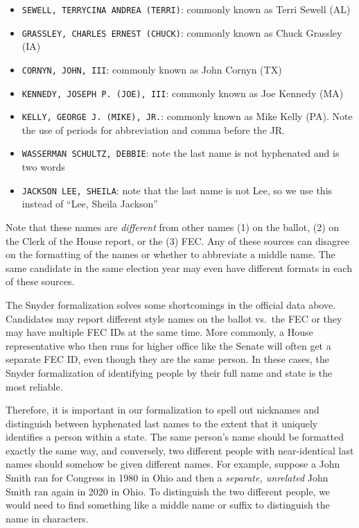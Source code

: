 \documentclass[12pt]{article}
\begin{document}
\begin{itemize}
\tightlist
\item
  \texttt{SEWELL,\ TERRYCINA\ ANDREA\ (TERRI)}: commonly known as Terri
  Sewell (AL)
\item
  \texttt{GRASSLEY,\ CHARLES\ ERNEST\ (CHUCK)}: commonly known as Chuck
  Grassley (IA)
\item
  \texttt{CORNYN,\ JOHN,\ III}: commonly known as John Cornyn (TX)
\item
  \texttt{KENNEDY,\ JOSEPH\ P.\ (JOE),\ III}: commonly known as Joe
  Kennedy (MA)
\item
  \texttt{KELLY,\ GEORGE\ J.\ (MIKE),\ JR.}: commonly known as Mike
  Kelly (PA). Note the use of periods for abbreviation and comma before
  the JR.
\item
  \texttt{WASSERMAN\ SCHULTZ,\ DEBBIE}: note the last name is not
  hyphenated and is two words
\item
  \texttt{JACKSON\ LEE,\ SHEILA}: note that the last name is not Lee, so
  we use this instead of ``Lee, Sheila Jackson''
\end{itemize}

Note that these names are \emph{different} from other names (1)
on the ballot, (2) on the Clerk of the House report, or the (3) FEC. Any
of these sources can disagree on the formatting of the names or whether
to abbreviate a middle name. The same candidate in the same election year may
even have different formats in each of these sources.

The Snyder formalization solves some shortcomings in the official data
above. Candidates may report different style names on the ballot vs.~the
FEC or they may have multiple FEC IDs at the same time. More commonly, a
House representative who then runs for higher office like the Senate will
often get a separate FEC ID, even though they are the same person. In
these cases, the Snyder formalization of identifying people by their full
name and state is the most reliable.

Therefore, it is important in our formalization to spell out nicknames
and distinguish between hyphenated last names to the extent that it
uniquely identifies a person within a state. The same person's name
should be formatted exactly the same way, and conversely, two different
people with near-identical last names should somehow be given
{different} names. For example, suppose a John Smith ran for Congress
in 1980 in Ohio and then a \emph{separate, unrelated} John Smith ran
again in 2020 in Ohio. To distinguish the two different people, we
would need to find {something} like a middle name or suffix to
distinguish the name in characters.
\end{document}
